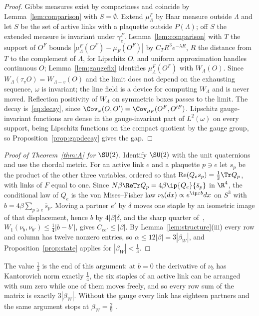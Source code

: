 \begin{proof}
Gibbs measures exist by compactness and coincide by Lemma~\ref{lem:comparison}
with $S=\emptyset$. Extend $\mu^F_\Lambda$ by Haar measure outside $\Lambda$ and
let $S$ be the set of active links with a plaquette outside $P(\Lambda)$; off $S$
the extended measure is invariant under $\gamma^F_e$. Lemma~\ref{lem:comparison}
with $T$ the support of $O^F$ bounds $|\mu^F_\Lambda(O^F)-\mu_F(O^F)|$ by
$C_TR^3e^{-\lambda R}$, $R$ the distance from $T$ to the complement of $\Lambda$,
for Lipschitz $O$, and uniform approximation handles continuous $O$;
Lemma~\ref{lem:gaugefix} identifies $\mu^F_\Lambda(O^F)$ with $W_\Lambda(O)$. Since
$W_\Lambda(\tau_vO)=W_{\Lambda-v}(O)$ and the limit does not depend on the
exhausting sequence, $\omega$ is invariant; the line field is a device for
computing $W_\Lambda$ and is never moved. Reflection positivity of $W_\Lambda$ on
symmetric boxes passes to the limit. The decay is~\eqref{eq:decay}, since
$\Cov_\omega(O,O')=\Cov_{\mu_F}(O^F,O'^F)$. Lipschitz gauge-invariant functions
are dense in the gauge-invariant part of $L^2(\omega)$ on every support, being
Lipschitz functions on the compact quotient by the gauge group, so
Proposition~\ref{prop:gapdecay} gives the gap.
\end{proof}

\begin{proof}[Proof of Theorem~\ref{thm:A} for $\SU(2)$]
Identify $\SU(2)$ with the unit quaternions and use the chordal metric. For an
active link $e$ and a plaquette $p\ni e$ let $s_p$ be the product of the other
three variables, ordered so that $\operatorname{Re}(Q_es_p)=\frac12\Tr Q_p$, with
links of $F$ equal to one. Since $N\beta\ReTr Q_p=4\beta\ip{Q_e}{\bar s_p}$ in
$\R^4$, the conditional law of $Q_e$ is the von Mises--Fisher law $\nu_b(dx)
\propto e^{\ip xb}dx$ on $S^3$ with $b=4\beta\sum_{p\ni e}\bar s_p$. Moving a
partner $e'$ by $\delta$ moves one staple by an isometric image of that
displacement, hence $b$ by $4|\beta|\delta$, and the sharp
quarter of~\cite{BB26a}, $W_1(\nu_b,\nu_{b'})\le\frac14|b-b'|$, gives
$C_{ee'}\le|\beta|$. By Lemma~\ref{lem:structure}(iii) every row and column has
twelve nonzero entries, so $\alpha\le12|\beta|=3|\beta_W|$, and
Proposition~\ref{prop:state} applies for $|\beta_W|<\frac13$.
\end{proof}

The value $\frac13$ is the end of this argument: at $b=0$ the derivative of
$\nu_b$ has Kantorovich norm exactly $\frac14$, the six staples of an active
link can be arranged with sum zero while one of them moves freely, and so
every row sum of the matrix is exactly $3|\beta_W|$. Without the gauge every
link has eighteen partners and the same argument stops at $\beta_W=\frac29$
\cite[Prop.~13]{BB26a}.
